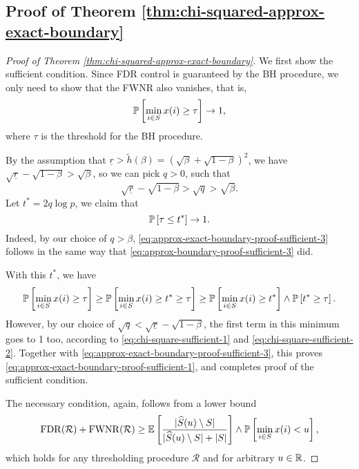 \subsection{Proof of Theorem \ref{thm:chi-squared-approx-exact-boundary}}
\label{subsec:proof-chi-squared-approx-exact-boundary}

\begin{proof}[Proof of Theorem \ref{thm:chi-squared-approx-exact-boundary}]
We first show the sufficient condition.
Since FDR control is guaranteed by the BH procedure, we only need to show that the FWNR also vanishes, that is,
\begin{equation} \label{eq:approx-exact-boundary-proof-sufficient-1}
    \P\left[\min_{i\in S}x(i) \ge \tau\right] \to 1,
\end{equation}
where $\tau$ is the threshold for the BH procedure.

By the assumption that $\underline{r}>\widetilde{h}(\beta)=(\sqrt{\beta}+\sqrt{1-\beta})^2$, we have $\sqrt{\underline{r}}-\sqrt{1-\beta}>\sqrt{\beta}$, so we can pick $q>0$, such that 
\begin{equation} \label{eq:approx-exact-boundary-proof-sufficient-2}
\sqrt{\underline{r}}-\sqrt{1-\beta}>\sqrt{q}>\sqrt{\beta}.
\end{equation}
Let $t^*=2q\log{p}$, we claim that 
\begin{equation} \label{eq:approx-exact-boundary-proof-sufficient-3}
\P\left[\tau\le t^*\right]\to 1.
\end{equation}
Indeed, by our choice of $q>\beta$, \eqref{eq:approx-exact-boundary-proof-sufficient-3} follows in the same way that \eqref{eq:approx-boundary-proof-sufficient-3} did.

With this $t^*$, we have
\begin{equation} \label{eq:approx-exact-boundary-proof-sufficient-4}
    \P\left[\min_{i\in S}x(i) \ge \tau\right] \ge 
    \P\left[\min_{i\in S}x(i) \ge t^* \ge \tau\right] \ge
    \P\left[\min_{i\in S}x(i) \ge t^*\right] \wedge \P\left[t^* \ge \tau\right].
\end{equation}
However, by our choice of $\sqrt{q} < \sqrt{\underline{r}}-\sqrt{1-\beta}$, the first term in this minimum goes to 1 too, according to \eqref{eq:chi-square-sufficient-1} and \eqref{eq:chi-square-sufficient-2}.
Together with \eqref{eq:approx-exact-boundary-proof-sufficient-3}, this proves \eqref{eq:approx-exact-boundary-proof-sufficient-1}, and completes proof of the sufficient condition.

The necessary condition, again, follows from a lower bound
\begin{equation} \label{eq:approx-exact-boundary-proof-necessary-1}
    \mathrm{FDR}(\mathcal{R}) + \mathrm{FWNR}(\mathcal{R}) \ge \E\left[\frac{|\widehat{S}(u)\setminus S|}{|\widehat{S}(u)\setminus S| + |S|}\right] \wedge 
    \P\left[\min_{i\in S}x(i)<u\right],
\end{equation}
which holds for any thresholding procedure $\mathcal{R}$ and for arbitrary $u\in\mathbb R$.


\end{proof}
